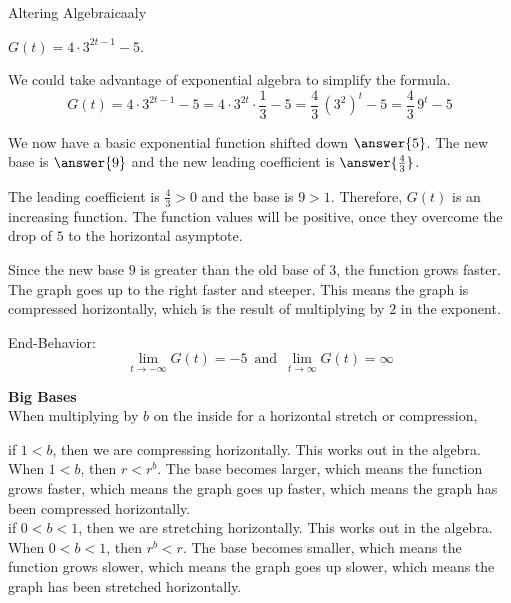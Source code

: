 \documentclass{ximera}
\begin{document}
\begin{example} Altering Algebraicaaly



$G(t) = 4 \cdot 3^{2t-1} - 5$.  

We could take advantage of exponential algebra to simplify the formula.   \\

\[ 
G(t) = 4 \cdot 3^{2t-1} - 5 = 4 \cdot 3^{2t} \cdot \frac{1}{3} - 5 = \frac{4}{3} \, (3^2)^t - 5  = \frac{4}{3} \, 9^t - 5
\]


We now have a basic exponential function shifted down $\answer{5}$.  The new base is $\answer{9}$ and the new leading coefficient is $\answer{\frac{4}{3}}$.




The leading coefficient is $\frac{4}{3} > 0$ and the base is $9 > 1$. Therefore, $G(t)$ is an increasing function.  The function values will be positive, once they overcome the drop of $5$ to the horizontal asymptote.


Since the new base $9$ is greater than the old base of $3$, the function grows faster.  The graph goes up to the right faster and steeper.  This means the graph is compressed horizontally, which is the result of multiplying by $2$ in the exponent.





End-Behavior:
\[
\lim\limits_{t \to -\infty}G(t) = -5 \, \text{ and } \, \lim\limits_{t \to \infty}G(t) = \infty
\]




\end{example}










\begin{observation} \textbf{\textcolor{blue!55!black}{Big Bases}}     \\



When multiplying by $b$ on the inside for a horizontal stretch or compression, 


if $1 < b$, then we are compressing horizontally.  This works out in the algebra. When $1 < b$, then $r < r^b$. The base becomes larger, which means the function grows faster, which means the graph goes up faster, which means the graph has been compressed horizontally. \\



if $0 < b < 1$, then we are stretching horizontally.  This works out in the algebra. When $0 < b < 1$, then $r^b < r$. The base becomes smaller, which means the function grows slower, which means the graph goes up slower, which means the graph has been stretched horizontally.


\end{observation}
\end{document}

